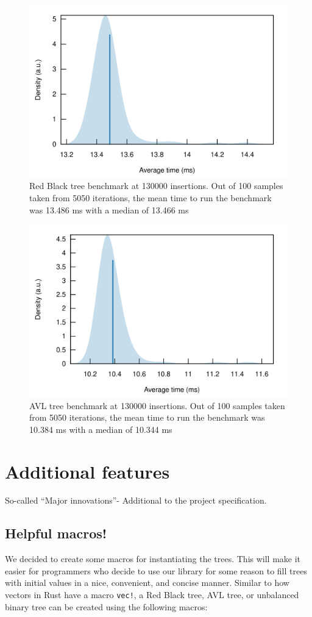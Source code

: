 \documentclass[letterpaper]{article}
\begin{document}
\begin{figure}[H]
      \centering
      \includegraphics[width=.8\textwidth]{rbbeeg.png}
      \caption{Red Black tree benchmark at 130000 insertions. Out of 100 samples
      taken from 5050 iterations, the mean time to run the benchmark was 13.486
      ms with a median of 13.466 ms}
\end{figure}


\begin{figure}[H]
      \centering
      \includegraphics[width=.8\textwidth]{avlbeeg.png}
      \caption{AVL tree benchmark at 130000 insertions. Out of 100 samples
      taken from 5050 iterations, the mean time to run the benchmark was 10.384
    ms with a median of 10.344 ms}
\end{figure}

\section{Additional features}
So-called ``Major innovations''- Additional to the project specification.

\subsection{Helpful macros!}
We decided to create some macros for instantiating the trees.  This will make it
easier for programmers who decide to use our library for some reason to fill
trees with initial values in a nice, convenient, and concise manner.  
Similar to how vectors in Rust have a macro \texttt{vec!}, a Red Black tree,
AVL tree, or unbalanced binary tree can be created using the
following macros:
\end{document}
